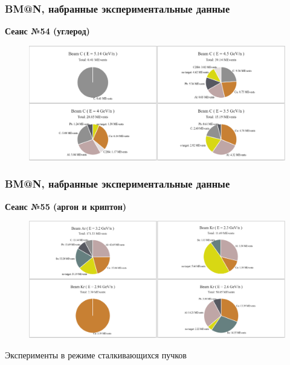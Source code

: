 \documentclass[dvipsnames] {beamer}
\begin{document}
\begin{frame}
  \frametitle{\bf \centering BM@N, набранные экспериментальные данные}
  \begin{block}{\bf \centering Сеанс №54 (углерод)}
     \begin{figure}[H]
       \includegraphics[width=1.\linewidth]{Run6_stat.png}
     \end{figure}
  \end{block}
\end{frame}

\begin{frame}
  \frametitle{\bf \centering BM@N, набранные экспериментальные данные}
  \begin{block}{\bf \centering Сеанс №55 (аргон и криптон)}
     \begin{figure}[H]
       \includegraphics[width=1.\linewidth]{Run7_stat.png}
     \end{figure}
  \end{block}
\end{frame}

\begin{frame}
  \bf
  \begin{block}{}
    \begin{center}
      {\Huge Эксперименты в режиме сталкивающихся пучков}
    \end{center}
  \end{block}
\end{frame}
\end{document}
